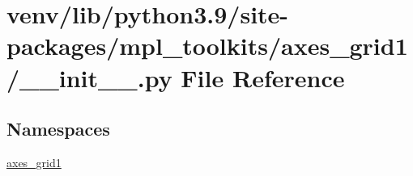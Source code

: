 \hypertarget{venv_2lib_2python3_89_2site-packages_2mpl__toolkits_2axes__grid1_2____init_____8py}{}\section{venv/lib/python3.9/site-\/packages/mpl\+\_\+toolkits/axes\+\_\+grid1/\+\_\+\+\_\+init\+\_\+\+\_\+.py File Reference}
\label{venv_2lib_2python3_89_2site-packages_2mpl__toolkits_2axes__grid1_2____init_____8py}
\subsection*{Namespaces}
\begin{DoxyCompactItemize}
\item 
 \hyperlink{namespaceaxes__grid1}{axes\+\_\+grid1}
\end{DoxyCompactItemize}
